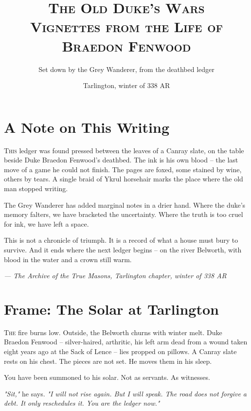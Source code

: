 \documentclass[11pt]{book}
\begin{document}
\frontmatter
\title{\Huge\scshape The Old Duke's Wars\\\large Vignettes from the Life of Braedon Fenwood}
\author{Set down by the Grey Wanderer, from the deathbed ledger}
\date{Tarlington, winter of 338 AR}
\maketitle
\tableofcontents

\mainmatter

\chapter*{A Note on This Writing}
\lettrine{T}{his} ledger was found pressed between the leaves of a Canray slate, on the table beside Duke Braedon Fenwood's deathbed. The ink is his own blood -- the last move of a game he could not finish. The pages are foxed, some stained by wine, others by tears. A single braid of Ykrul horsehair marks the place where the old man stopped writing.

The Grey Wanderer has added marginal notes in a drier hand. Where the duke's memory falters, we have bracketed the uncertainty. Where the truth is too cruel for ink, we have left a space.

This is not a chronicle of triumph. It is a record of what a house must bury to survive. And it ends where the next ledger begins -- on the river Belworth, with blood in the water and a crown still warm.

\vspace{1em}
\noindent\textit{--- The Archive of the True Masons, Tarlington chapter, winter of 338 AR}

\clearpage

\chapter{Frame: The Solar at Tarlington}

\lettrine{T}{he} fire burns low. Outside, the Belworth churns with winter melt. Duke Braedon Fenwood -- silver-haired, arthritic, his left arm dead from a wound taken eight years ago at the Sack of Lence -- lies propped on pillows. A Canray slate rests on his chest. The pieces are not set. He moves them in his sleep.

You have been summoned to his solar. Not as servants. As witnesses.

\vspace{1em}
\noindent\textit{"Sit,"} he says. \textit{"I will not rise again. But I will speak. The road does not forgive a debt. It only reschedules it. You are the ledger now."}
\end{document}
